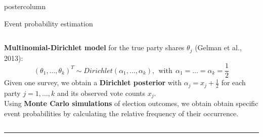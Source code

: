 \documentclass[final,hyperref={pdfpagelabels=false}]{beamer}
\newcommand{\darkgray}[1]{\textcolor{koaladarkgray}{#1}}
\begin{document}
\begin{frame}
\begin{columns}
\begin{column}{1\textwidth}
\begin{columns}[T]
\begin{column}{.484\textwidth}
\begin{beamercolorbox}[center,wd=\textwidth]{postercolumn}
\begin{minipage}[T]{.95\textwidth}
\begin{block}{\footnotesize Event probability estimation}
\begin{minipage}{\textwidth}
\begin{columns}[t]
  \begin{column}{.93\textwidth}
  \vspace{7px}
  \begin{minipage}{\textwidth}
  \darkgray{\textbf{Multinomial-Dirichlet model}}
for the true party shares $\theta_j$ {\footnotesize (Gelman et al., 2013)}:
$$
(\theta_1,\ldots,\theta_k)^T \sim Dirichlet(\alpha_1,\ldots,\alpha_k), \ \ \text{with} \ \ \alpha_1 = \ldots = \alpha_k = \frac{1}{2}
$$
Given one survey, we obtain a \darkgray{\textbf{Dirichlet posterior}}
with $\alpha_j = x_j + \frac{1}{2}$ for each party $j=1,\ldots,k$ and its observed
vote counts $x_j$.
\\[0.5cm]
Using \darkgray{\textbf{Monte Carlo simulations}} of election outcomes, we obtain
obtain specific event probabilities by calculating the relative frequency of their
occurrence.
  \end{minipage}
  \vspace{7px}
  \end{column}
\end{columns}
\end{minipage}

\vspace{1ex}
\textcolor{LMUlightgray}{\hrule{}}
\vspace{5ex}


\end{block}
\end{minipage}
\end{beamercolorbox}
\end{column}
\end{columns}
\end{column}
\end{columns}
\end{frame}
\end{document}
